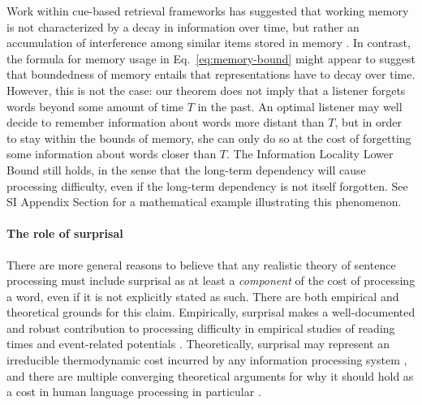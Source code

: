 Work within cue-based retrieval frameworks has suggested that working memory is not characterized by a decay in information over time, but rather an accumulation of interference among similar items stored in memory \citep[][p. 408]{lewis-activation-based-2005}.
In contrast, the formula for memory usage in Eq.~\ref{eq:memory-bound} might appear to suggest that boundedness of memory entails that representations have to decay over time.
However, this is not the case:
our theorem does not imply that a listener forgets words beyond some amount of time $T$ in the past. 
An optimal listener may well decide to remember information about words more distant than $T$, but in order to stay within the bounds of memory, she can only do so at the cost of forgetting some information about words closer than $T$.
The Information Locality Lower Bound still holds, in the sense that the long-term dependency will cause processing difficulty, even if the long-term dependency is not itself forgotten.
See SI Appendix Section \REF for a mathematical example illustrating this phenomenon.



\paragraph{The role of surprisal}

There are more general reasons to believe that any realistic theory of sentence processing must include surprisal as at least a \emph{component} of the cost of processing a word, even if it is not explicitly stated as such. 
There are both empirical and theoretical grounds for this claim.
Empirically, surprisal makes a well-documented and robust contribution to processing difficulty in empirical studies of reading times and event-related potentials \citep{smith2013effect,frank2015erp}. 
Theoretically, surprisal may represent an irreducible thermodynamic cost incurred by any information processing system  \citep{landauer,still2012thermodynamic,zenon2019information}, and there are multiple converging theoretical arguments for why it should hold as a cost in human language processing in particular \cite[see][for a review]{levy2013memory}. 




